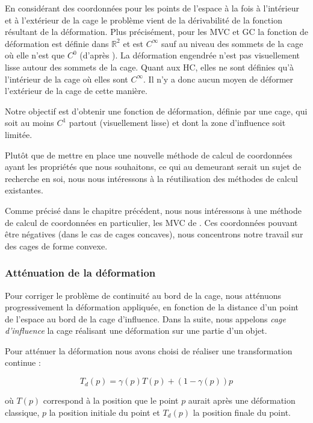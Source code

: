 En considérant des coordonnées pour les points de l'espace à la fois à
l'intérieur et à l'extérieur de la cage le problème vient de la dérivabilité
de la fonction résultant de la déformation. Plus précisément, pour les MVC et
GC la fonction de déformation est définie dans $\mathbb{R}^2$ et est
$C^{\infty}$ sauf au niveau des sommets de la cage où elle n'est que
$C^0$ (d'après \cite{LS08}). La déformation engendrée n'est pas visuellement lisse autour des
sommets de la cage. Quant aux HC, elles ne sont définies qu'à l'intérieur de
la cage où elles sont $C^{\infty}$. Il n'y a donc aucun moyen de déformer
l'extérieur de la cage de cette manière.

Notre objectif est d'obtenir une fonction de déformation, définie par une
cage, qui soit au moins $C^1$ partout (visuellement lisse) et dont la zone
d'influence soit limitée.

Plutôt que de mettre en place une nouvelle méthode de calcul de coordonnées
ayant les propriétés que nous souhaitons, ce qui au demeurant serait un sujet
de recherche en soi, nous nous intéressons à la réutilisation des méthodes de
calcul existantes. 

Comme précisé dans le chapitre précédent, nous nous intéressons à une méthode
de calcul de coordonnées en particulier, les MVC de \cite{Flo03}. Ces
coordonnées pouvant être négatives (dans le cas de cages concaves), nous
concentrons notre travail sur des cages de forme convexe.

\subsubsection{Atténuation de la déformation}

Pour corriger le problème de continuité au bord de la cage, nous atténuons
progressivement la déformation appliquée, en fonction de la distance d'un
point de l'espace au bord de la cage d'influence. Dans la suite, nous appelons
\textit{cage d'influence} la cage réalisant une déformation sur une partie
d'un objet.

Pour atténuer la déformation nous avons choisi de réaliser une transformation
continue :

\begin{equation}
  T_{d}(p) = \gamma(p) T(p) + (1-\gamma(p)) p
  \label{MELAtt}
\end{equation}

où $T(p)$ correspond à la position que le point $p$ aurait après une déformation
classique, $p$ la position initiale du point et $T_{d}(p)$ la position finale
du point.

